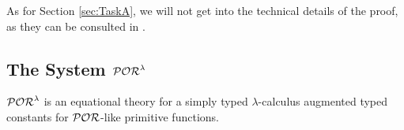As for Section \ref{sec:TaskA}, we will not get into the technical
details of the proof, as they can be consulted in \cite{RBA}.
























































































\subsection{The System $\mathcal{POR}^\lambda$}\label{sec:PORo}
$\mathcal{POR}^\lambda$ is an equational theory
for a simply typed $\lambda$-calculus
augmented typed constants for $\mathcal{POR}$-like primitive functions.
















